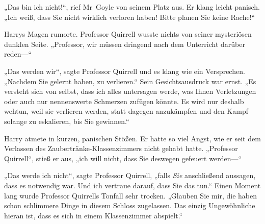 „Das bin ich nicht!“, rief Mr~Goyle von seinem Platz aus. Er klang leicht panisch. „Ich weiß, dass Sie nicht wirklich verloren haben! Bitte planen Sie keine Rache!“

Harrys Magen rumorte. Professor Quirrell wusste nichts von seiner mysteriösen dunklen Seite. „Professor, wir müssen dringend nach dem Unterricht darüber reden—“

„Das werden wir“, sagte Professor Quirrell und es klang wie ein Versprechen. „Nachdem Sie gelernt haben, zu verlieren.“ Sein Gesichtsausdruck war ernst. „Es versteht sich von selbst, dass ich alles untersagen werde, was Ihnen Verletzungen oder auch nur nennenswerte Schmerzen zufügen könnte. Es wird nur deshalb wehtun, weil sie verlieren werden, statt dagegen anzukämpfen und den Kampf solange zu eskalieren, bis Sie gewinnen.“

Harry atmete in kurzen, panischen Stößen. Er hatte so viel Angst, wie er seit dem Verlassen des Zaubertränke-Klassenzimmers nicht gehabt hatte. „Professor Quirrell“, stieß er aus, „ich will nicht, dass Sie deswegen gefeuert werden—“

„Das werde ich nicht“, sagte Professor Quirrell, „falls \emph{Sie} anschließend aussagen, dass es notwendig war. Und ich vertraue darauf, dass Sie das tun.“ Einen Moment lang wurde Professor Quirrells Tonfall sehr trocken. „Glauben Sie mir, die haben schon schlimmere Dinge in diesem Schloss zugelassen. Das einzig Ungewöhnliche hieran ist, dass es sich in einem Klassenzimmer abspielt.“

